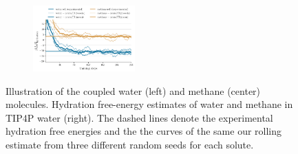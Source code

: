 \documentclass[%
onecolumn,
superscriptaddress,
nofootinbib,
amsmath,amssymb,
table
]{revtex4-2}
\begin{document}
\begin{figure}[htb]
     \centering
     \begin{subfigure}
         \centering
     \end{subfigure}
     \hfill
          \begin{subfigure}
         \centering
     \end{subfigure}
     \hfill
     \begin{subfigure}
         \centering
\includegraphics[width=0.43\textwidth,trim={0cm .25cm .2cm .2cm},clip]{figures/hydration_free_energy.pdf}
     \end{subfigure}
     \caption{Illustration of the coupled water (left) and methane (center) molecules. Hydration free-energy estimates of water and methane in TIP4P water (right). The dashed lines denote the experimental hydration free energies and the the curves of the same our rolling estimate from three different random seeds for each solute.}
    \label{fig:results_hydration}
\end{figure}
\end{document}
